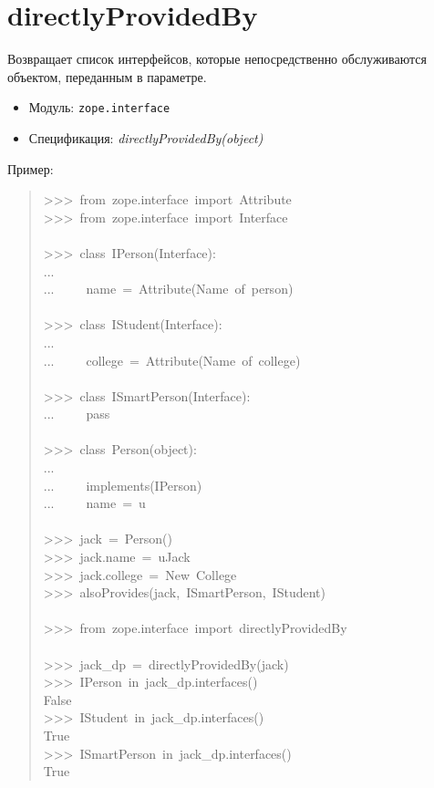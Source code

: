\documentclass[14pt,a4paper,openany,twoside,final]{extbook}
\providecommand*{\DUroletitlereference}[1]{\textsl{#1}}
\begin{document}
\section*{directlyProvidedBy%
  \label{directlyprovidedby}%
}

Возвращает список интерфейсов, которые непосредственно обслуживаются
объектом, переданным в параметре.

\begin{itemize}

\item Модуль: \texttt{zope.interface}

\item Спецификация: \DUroletitlereference{directlyProvidedBy(object)}

\end{itemize}

Пример:

\begin{quote}{\ttfamily \raggedright \noindent
>{}>{}>~from~zope.interface~import~Attribute\\
>{}>{}>~from~zope.interface~import~Interface\\
~\\
>{}>{}>~class~IPerson(Interface):\\
...\\
...~~~~~name~=~Attribute(\textquotedbl{}Name~of~person\textquotedbl{})\\
~\\
>{}>{}>~class~IStudent(Interface):\\
...\\
...~~~~~college~=~Attribute(\textquotedbl{}Name~of~college\textquotedbl{})\\
~\\
>{}>{}>~class~ISmartPerson(Interface):\\
...~~~~~pass\\
~\\
>{}>{}>~class~Person(object):\\
...\\
...~~~~~implements(IPerson)\\
...~~~~~name~=~u\textquotedbl{}\textquotedbl{}\\
~\\
>{}>{}>~jack~=~Person()\\
>{}>{}>~jack.name~=~u\textquotedbl{}Jack\textquotedbl{}\\
>{}>{}>~jack.college~=~\textquotedbl{}New~College\textquotedbl{}\\
>{}>{}>~alsoProvides(jack,~ISmartPerson,~IStudent)\\
~\\
>{}>{}>~from~zope.interface~import~directlyProvidedBy\\
~\\
>{}>{}>~jack\_dp~=~directlyProvidedBy(jack)\\
>{}>{}>~IPerson~in~jack\_dp.interfaces()\\
False\\
>{}>{}>~IStudent~in~jack\_dp.interfaces()\\
True\\
>{}>{}>~ISmartPerson~in~jack\_dp.interfaces()\\
True
}
\end{quote}
\end{document}

